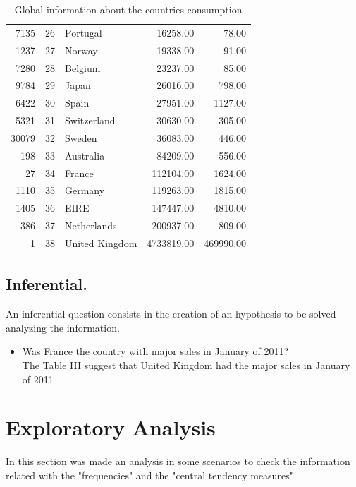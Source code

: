 \documentclass[conference]{IEEEtran}\usepackage[]{graphicx}\usepackage[]{color}
\begin{document}
\begin{itemize}
\begin{table}[ht]
\begin{tabular}{rrlrr}
  7135 &  26 & Portugal & 16258.00 & 78.00 \\ 
  1237 &  27 & Norway & 19338.00 & 91.00 \\ 
  7280 &  28 & Belgium & 23237.00 & 85.00 \\ 
  9784 &  29 & Japan & 26016.00 & 798.00 \\ 
  6422 &  30 & Spain & 27951.00 & 1127.00 \\ 
  5321 &  31 & Switzerland & 30630.00 & 305.00 \\ 
  30079 &  32 & Sweden & 36083.00 & 446.00 \\ 
  198 &  33 & Australia & 84209.00 & 556.00 \\ 
  27 &  34 & France & 112104.00 & 1624.00 \\ 
  1110 &  35 & Germany & 119263.00 & 1815.00 \\ 
  1405 &  36 & EIRE & 147447.00 & 4810.00 \\ 
  386 &  37 & Netherlands & 200937.00 & 809.00 \\ 
  1 &  38 & United Kingdom & 4733819.00 & 469990.00 \\ 
   \hline
\end{tabular}
\caption{Global information about the countries consumption} 
\end{table}

   
  \end{itemize}
  \subsection{Inferential.}
   An inferential question consists in the creation of an hypothesis to be solved analyzing the information.
  \begin{itemize}
   \item Was France the country with major sales in January of 2011?\\
   The Table III suggest that United Kingdom had the major sales in January of 2011
  \end{itemize}


\section{Exploratory Analysis}
In this section was made an analysis in some scenarios to check the information related with the "frequencies" and the "central tendency measures"\\
\end{document}
